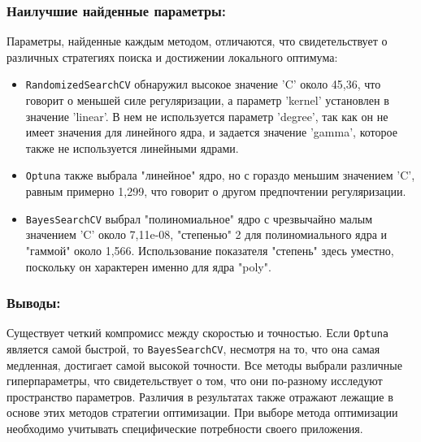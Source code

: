 \documentclass{article}
\begin{document}
\subsubsection{Наилучшие найденные параметры:}
Параметры, найденные каждым методом, отличаются, что свидетельствует о различных стратегиях поиска и достижении локального оптимума:
\begin{itemize}
  \item \texttt{RandomizedSearchCV} обнаружил высокое значение 'C' около 45,36, что говорит о меньшей силе регуляризации, а параметр 'kernel' установлен в значение 'linear'. В нем не используется параметр 'degree', так как он не имеет значения для линейного ядра, и задается значение 'gamma', которое также не используется линейными ядрами.
  \item \texttt{Optuna} также выбрала "линейное" ядро, но с гораздо меньшим значением 'C', равным примерно 1,299, что говорит о другом предпочтении регуляризации.
  \item \texttt{BayesSearchCV} выбрал "полиномиальное" ядро с чрезвычайно малым значением 'C' около 7,11e-08, "степенью" 2 для полиномиального ядра и "гаммой" около 1,566. Использование показателя "степень" здесь уместно, поскольку он характерен именно для ядра "poly".
\end{itemize}

\subsubsection{Выводы:}
Существует четкий компромисс между скоростью и точностью. Если \texttt{Optuna} является самой быстрой, то \texttt{BayesSearchCV}, несмотря на то, что она самая медленная, достигает самой высокой точности. Все методы выбрали различные гиперпараметры, что свидетельствует о том, что они по-разному исследуют пространство параметров. Различия в результатах также отражают лежащие в основе этих методов стратегии оптимизации. При выборе метода оптимизации необходимо учитывать специфические потребности своего приложения.



\end{document}
